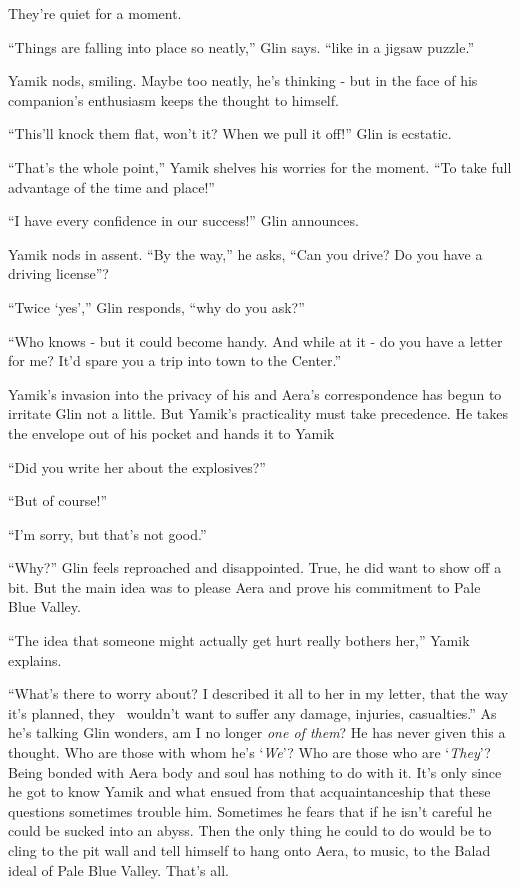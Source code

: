 \documentclass[twoside,11pt]{book}
\begin{document}
They're quiet for a moment.

``Things are falling into place so neatly,'' Glin says. ``like in a jigsaw
puzzle.''

Yamik nods, smiling. Maybe too neatly, he's thinking - but in the face of his companion's enthusiasm keeps the thought
to himself.

``This'll knock them flat, won't it? When we pull it off!'' Glin is ecstatic.

``That's the whole point,'' Yamik shelves his worries for the moment. ``To take
full advantage of the time and place!''

``I have every confidence in our success!'' Glin announces.

Yamik nods in assent. ``By the way,'' he asks, ``Can you drive? Do you have a
driving license''?

``Twice `yes','' Glin responds, ``why do you ask?''

``Who knows - but it could become handy. And while at it - do you have a letter for me? It'd spare you a
trip into town to the Center.''

Yamik's invasion into the privacy of his and Aera's correspondence has begun to irritate Glin not a little. But Yamik's
practicality must take precedence. He takes the envelope out of his pocket and hands it to Yamik

``Did you write her about the explosives?''

``But of course!''

``I'm sorry, but that's not good.''

``Why?'' Glin feels reproached and disappointed. True, he did want to show off a bit. But the
main idea was to please Aera and prove his commitment to Pale Blue Valley.

``The idea that someone might actually get hurt really bothers her,'' Yamik explains.

``What's there to worry about? I described it all to her in my letter, that the way it's planned, they
\ wouldn't want to suffer any damage, injuries, casualties.'' As he's talking Glin wonders, am I no
longer \textit{one of them}? He has never given this a thought. Who are those
with whom he's `\textit{We}'? Who are those who are `\textit{They}'? Being bonded with Aera body and soul has
nothing to do with it. It's only since he got to know Yamik and what ensued from that acquaintanceship that these
questions sometimes trouble him. Sometimes he fears that if he isn't careful he could be sucked into an abyss. Then
the only thing he could to do would be to cling to the pit wall and tell himself to hang onto Aera, to music, to the
Balad ideal of Pale Blue Valley. That's all.
\end{document}
